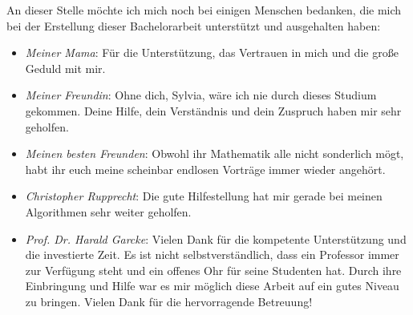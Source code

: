 \begin{large}
An dieser Stelle möchte ich mich noch bei einigen Menschen bedanken, die mich bei der Erstellung dieser Bachelorarbeit unterstützt und ausgehalten haben:
\begin{itemize}
\item \textit{Meiner Mama}: Für die Unterstützung, das Vertrauen in mich und die große Geduld mit mir.
\item \textit{Meiner Freundin}: Ohne dich, Sylvia, wäre ich nie durch dieses Studium gekommen. Deine Hilfe, dein Verständnis und dein Zuspruch haben mir sehr geholfen.
\item \textit{Meinen besten Freunden}: Obwohl ihr Mathematik alle nicht sonderlich mögt, habt ihr euch meine scheinbar endlosen Vorträge immer wieder angehört.
\item \textit{Christopher Rupprecht}: Die gute Hilfestellung hat mir gerade bei meinen Algorithmen sehr weiter geholfen.
\item \textit{Prof. Dr. Harald Garcke}:  Vielen Dank für die kompetente Unterstützung und die investierte Zeit. Es ist nicht selbstverständlich, dass ein Professor immer zur Verfügung steht und ein offenes Ohr für seine Studenten hat. Durch ihre Einbringung und Hilfe war es mir möglich diese Arbeit auf ein gutes Niveau zu bringen. Vielen Dank für die hervorragende Betreuung!
\end{itemize}
\end{large}


